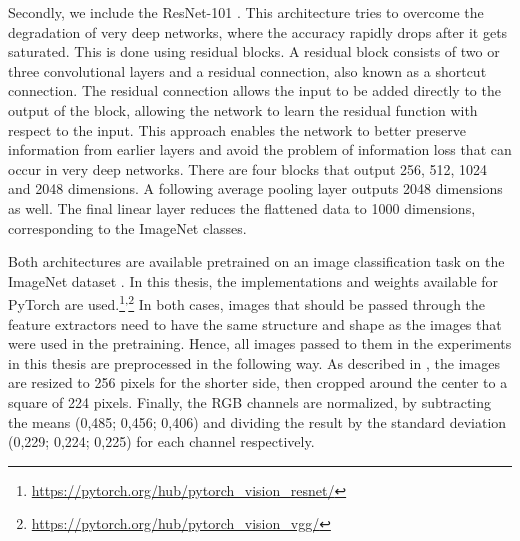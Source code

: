 Secondly, we include the ResNet-101 \citep{He2016}.
This architecture tries to overcome the degradation of very deep networks, where the accuracy rapidly drops after it gets saturated.
This is done using residual blocks.
A residual block consists of two or three convolutional layers and a residual connection, also known as a shortcut connection.
The residual connection allows the input to be added directly to the output of the block, allowing the network to learn the residual function with respect to the input.
This approach enables the network to better preserve information from earlier layers and avoid the problem of information loss that can occur in very deep networks.
There are four blocks that output 256, 512, 1024 and 2048 dimensions.
A following average pooling layer outputs 2048 dimensions as well.
The final linear layer reduces the flattened data to 1000 dimensions, corresponding to the ImageNet classes.

Both architectures are available pretrained on an image classification task on the ImageNet dataset \citep{Deng2009}.
In this thesis, the implementations and weights available for PyTorch are used.\footnote{\href{https://pytorch.org/hub/pytorch\_vision\_resnet/}{https://pytorch.org/hub/pytorch\_vision\_resnet/}}\textsuperscript{,}\footnote{\href{https://pytorch.org/hub/pytorch\_vision\_vgg/}{https://pytorch.org/hub/pytorch\_vision\_vgg/}}
In both cases, images that should be passed through the feature extractors need to have the same structure and shape as the images that were used in the pretraining.
Hence, all images passed to them in the experiments in this thesis are preprocessed in the following way.
As described in \citep{He2016,Simonyan2015}, the images are resized to 256 pixels for the shorter side, then cropped around the center to a square of 224 pixels.
Finally, the RGB channels are normalized, by subtracting the means (0,485; 0,456; 0,406) and dividing the result by the standard deviation (0,229; 0,224; 0,225) for each channel respectively.

